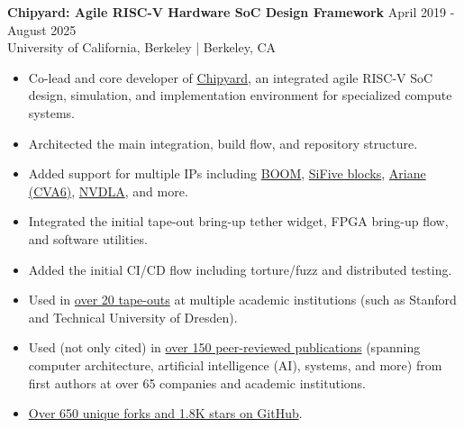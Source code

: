 \documentclass[line]{res}
\begin{document}
\begin{resume}
\label{sec:chipyard}
\textbf{Chipyard: Agile RISC-V Hardware SoC Design Framework} \hfill April 2019 - August 2025
\\
University of California, Berkeley | Berkeley, CA
\\
\vspace{-3mm}
\begin{itemize}
\item Co-lead and core developer of \href{https://github.com/ucb-bar/chipyard}{Chipyard}, an integrated agile RISC-V SoC design, simulation, and implementation environment for specialized compute systems.
\item Architected the main integration, build flow, and repository structure.
\item Added support for multiple IPs including \hyperref[sec:boom]{BOOM}, \href{https://github.com/chipsalliance/rocket-chip-blocks}{SiFive blocks}, \href{https://github.com/openhwgroup/cva6}{Ariane (CVA6)}, \href{https://nvdla.org/}{NVDLA}, and more.
\item Integrated the initial tape-out bring-up tether widget, FPGA bring-up flow, and software utilities.
\item Added the initial CI/CD flow including torture/fuzz and distributed testing.
\item Used in \href{https://scholar.google.com/scholar?cites=4549882523608568335&as_sdt=2005&sciodt=0,5&hl=en}{over 20 tape-outs} at multiple academic institutions (such as Stanford and Technical University of Dresden).
\item Used (not only cited) in \href{https://scholar.google.com/scholar?cites=4549882523608568335&as_sdt=2005&sciodt=0,5&hl=en}{over 150 peer-reviewed publications} (spanning computer architecture, artificial intelligence (AI), systems, and more) from first authors at over 65 companies and academic institutions.
\item \href{https://github.com/ucb-bar/chipyard}{Over 650 unique forks and 1.8K stars on GitHub}.
\end{itemize}

\vspace{-2.4mm}


\end{resume}
\end{document}
